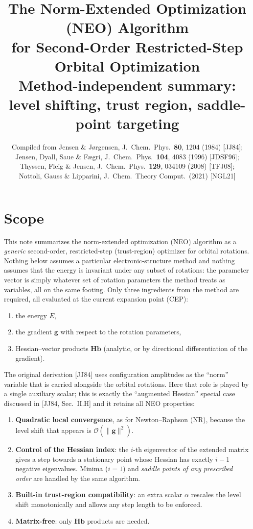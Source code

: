 \documentclass[11pt,a4paper]{article}
\title{The Norm-Extended Optimization (NEO) Algorithm\\
for Second-Order Restricted-Step Orbital Optimization\\
{\large Method-independent summary: level shifting, trust region, saddle-point targeting}}
\author{Compiled from Jensen \& J\o rgensen, J.\ Chem.\ Phys.\ \textbf{80}, 1204 (1984) [JJ84];\\
Jensen, Dyall, Saue \& F\ae gri, J.\ Chem.\ Phys.\ \textbf{104}, 4083 (1996) [JDSF96];\\
Thyssen, Fleig \& Jensen, J.\ Chem.\ Phys.\ \textbf{129}, 034109 (2008) [TFJ08];\\
Nottoli, Gauss \& Lipparini, J.\ Chem.\ Theory Comput.\ (2021) [NGL21]}
\date{}
\newcommand{\bH}{\mathbf{H}}
\newcommand{\bg}{\mathbf{g}}
\newcommand{\bb}{\mathbf{b}}
\begin{document}
\maketitle
\tableofcontents

\section{Scope}
This note summarizes the norm-extended optimization (NEO) algorithm as a \emph{generic} second-order, restricted-step (trust-region)
optimizer for orbital rotations. Nothing below assumes a particular electronic-structure method and nothing assumes that the energy is
invariant under any subset of rotations: the parameter vector is simply whatever set of rotation parameters the method treats as variables, all on the same footing.
Only three ingredients from the method are required, all evaluated at the current expansion point (CEP):
\begin{enumerate}[nosep]
 \item the energy $E$,
 \item the gradient $\bg$ with respect to the rotation parameters,
 \item Hessian--vector products $\bH\bb$ (analytic, or by directional differentiation of the gradient).
\end{enumerate}
The original derivation [JJ84] uses configuration amplitudes as the ``norm'' variable that is carried alongside the orbital rotations. Here that role is played by
a single auxiliary scalar; this is exactly the ``augmented Hessian'' special case discussed in [JJ84, Sec.~II.H] and it retains all NEO properties:
\begin{enumerate}[nosep]
 \item \textbf{Quadratic local convergence}, as for Newton--Raphson (NR), because the level shift that appears is $\mathcal O(\|\bg\|^2)$.
 \item \textbf{Control of the Hessian index}: the $i$-th eigenvector of the extended matrix gives a step towards a stationary point whose Hessian has exactly $i-1$ negative eigenvalues. Minima ($i=1$) and \emph{saddle points of any prescribed order} are handled by the same algorithm.
 \item \textbf{Built-in trust-region compatibility}: an extra scalar $\alpha$ rescales the level shift monotonically and allows any step length to be enforced.
 \item \textbf{Matrix-free}: only $\bH\bb$ products are needed.
\end{enumerate}
\end{document}
